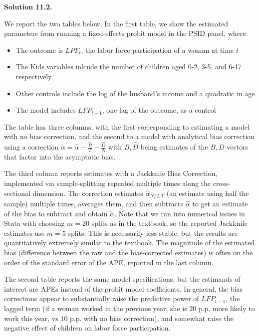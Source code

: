 \documentclass[11pt]{article}
\newenvironment{solution}[1]
    {\bigskip\noindent\textbf{Solution #1.} \par}
    {\medskip}
\begin{document}
\begin{solution}{11.2}
We report the two tables below. In the first table, we show the estimated parameters from running a fixed-effects probit model in the PSID panel, where:
\begin{itemize}
    \item The outcome is $LPF_t$, the labor force participation of a woman at time $t$
    \item The Kids variables inlcude the number of children aged 0-2, 3-5, and 6-17 respectively
    \item Other controls include the log of the husband's income and a quadratic in age
    \item The model includes $LFP_{t-1}$, one lag of the outcome, as a control
\end{itemize}

The table has three columns, with the first corresponding to estimating a model with no bias correction, and the second to a model with analytical bias correction using a correction $\check \alpha = \hat \alpha - \frac{\hat B}{T} - \frac{\hat D}{N}$ with $\hat B,\hat D$ being estimates of the $B,D$ vectors that factor into the asymptotic bias.

The third column reports estimates with a Jackknife Bias Correction, implemented via sample-splitting repeated multiple times along the cross-sectional dimension. The correction estimates $\hat \alpha_{N/2,T}$ (an estimate using half the sample) multiple times, averages them, and then subtracts $\hat \alpha$ to get an estimate of the bias to subtract and obtain $\check \alpha$. Note that we ran into numerical issues in Stata with choosing $m=20$ splits as in the textbook, so the reported Jackknife estimates use $m=5$ splits. This is necessarily less stable, but the results are quantitatively extremely similar to the textbook. The magnitude of the estimated bias (difference between the raw and the bias-corrected estimates) is often on the order of the standard error of the APE, reported in the last column.

\begin{center}

\end{center}

The second table reports the same model specifications, but the estimands of interest are APEs instead of the probit model coefficients. In general, the bias corrections appear to substantially raise the predictive power of $LFP_{t-1}$, the lagged term (if a woman worked in the previous year, she is $20$ p.p. more likely to work this year, vs $10$ p.p. with no bias correction), and somewhat raise the negative effect of children on labor force participation.


\begin{center}

\end{center}

\end{solution}
\end{document}
